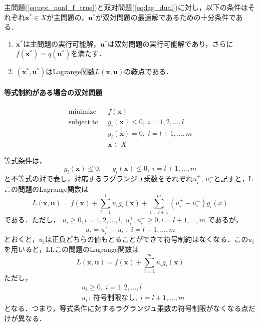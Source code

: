 \documentclass{jsreport}
\begin{document}
\begin{coro}
  主問題(\ref{eq:opt_nonl_f_true})と双対問題(\ref{eq:lag_dual})に対し，以下の条件はそれぞれ$\bm{x}^{*} \in X$が主問題の，$\bm{u}^{*}$が双対問題の最適解であるための十分条件である．
  \begin{enumerate}
    \item $\bm{x}^{*}$は主問題の実行可能解，$\bm{u}^{*}$は双対問題の実行可能解であり，さらに$f(\bm{x}^{*}) = q(\bm{u}^{*})$を満たす．
    \item $(\bm{x}^{*}, \bm{u}^{*})$はLagrange関数$L(\bm{x}, \bm{u})$の鞍点である．
  \end{enumerate}
\end{coro}

\paragraph{等式制約がある場合の双対問題}

\begin{align}\label{eq:opt_nonl_eq_dual}
  \mathrm{minimize} \; \; &f(\bm{x}) \nonumber\\
  \mathrm{subject \; to} \; \; &g_i(\bm{x}) \leq 0, \; i = 1, 2, \ldots, l \nonumber \\
  &g_i(\bm{x}) = 0, \; i = l+1, \ldots, m \\
  &\bm{x} \in X \nonumber
\end{align}

等式条件は，
\begin{equation}
  g_i(\bm{x}) \leq 0, \; -g_i(\bm{x}) \leq 0, \; i = l + 1, \ldots, m \nonumber
\end{equation}
と不等式の対で表し，対応するラグランジュ乗数をそれぞれ$u_i^{+}, \, u_i^{-}$と記すと，Lこの問題のLagrange関数は
\begin{equation}\label{eq:lag_eq}
  L(\bm{x}, \bm{u}) = f(\bm{x}) + \sum_{i = 1}^l u_i g_i(\bm{x}) + \sum_{i = l + 1}^{m}(u_i^{+} - u_i^{-})g_i(x)
\end{equation}
である．ただし，
$u_i \geq 0, i = 1, 2, \ldots, l, \; u_i^{+}, u_i^{-} \geq 0, i = l + 1, \ldots, m$
であるが，
\begin{equation}
  u_i = u_i^{+} - u_i^{-}, \; i = l + 1, \ldots, m
\end{equation}
とおくと，$u_i$は正負どちらの値もとることができて符号制約はなくなる．この$u_i$を用いると，LLこの問題のLagrange関数は
\begin{equation}
  L(\bm{x}, \bm{u}) = f(\bm{x}) + \sum_{i = 1}^m u_i g_i(\bm{x}) \nonumber
\end{equation}
ただし，
\begin{align}\label{eq:lag_u}
  &u_i \geq 0, \; i = 1, 2, \ldots, l \nonumber \\
  &u_i \, : \, 符号制限なし, \; i = l + 1, \ldots, m
\end{align}
となる．つまり，等式条件に対するラグランジュ乗数の符号制限がなくなる点だけが異なる．
\end{document}
